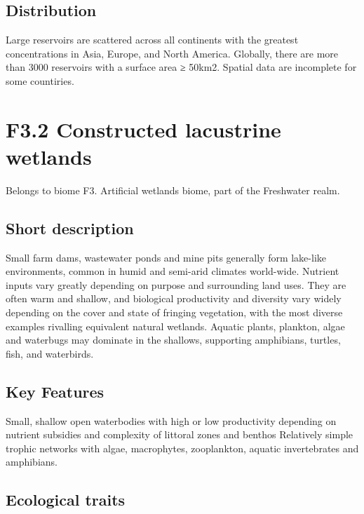 \documentclass[
  letterpaper,
  DIV=11,
  numbers=noendperiod]{scrartcl}
\begin{document}
\subsection{Distribution}\label{distribution-17}

Large reservoirs are scattered across all continents with the greatest
concentrations in Asia, Europe, and North America. Globally, there are
more than 3000 reservoirs with a surface area ≥ 50km2. Spatial data are
incomplete for some countiries.

\section{F3.2 Constructed lacustrine
wetlands}\label{f3.2-constructed-lacustrine-wetlands}

Belongs to biome F3. Artificial wetlands biome, part of the Freshwater
realm.

\subsection{Short description}\label{short-description-18}

Small farm dams, wastewater ponds and mine pits generally form lake-like
environments, common in humid and semi-arid climates world-wide.
Nutrient inputs vary greatly depending on purpose and surrounding land
uses. They are often warm and shallow, and biological productivity and
diversity vary widely depending on the cover and state of fringing
vegetation, with the most diverse examples rivalling equivalent natural
wetlands. Aquatic plants, plankton, algae and waterbugs may dominate in
the shallows, supporting amphibians, turtles, fish, and waterbirds.

\subsection{Key Features}\label{key-features-18}

Small, shallow open waterbodies with high or low productivity depending
on nutrient subsidies and complexity of littoral zones and benthos
Relatively simple trophic networks with algae, macrophytes, zooplankton,
aquatic invertebrates and amphibians.

\subsection{Ecological traits}\label{ecological-traits-18}
\end{document}
